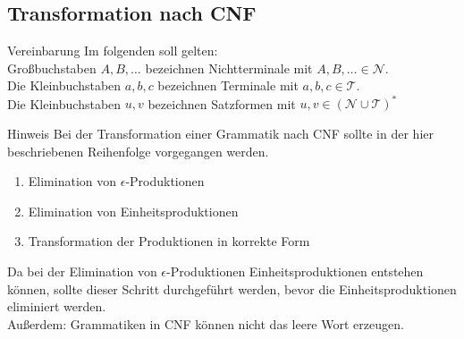 \documentclass[]{beamer}
\begin{document}
\subsection{Transformation nach CNF}
\begin{frame}[squeeze]{}
  \vspace*{-0.25em}
  \begin{alertblock}{Vereinbarung}
    Im folgenden soll gelten: \\
    \vspace*{0.5em}
    Großbuchstaben $A, B, \ldots$ bezeichnen Nichtterminale mit $A, B, \ldots \in \mathcal{N}$. \\
    \vspace*{0.5em}
    Die Kleinbuchstaben $a, b, c$ bezeichnen Terminale mit $a, b, c \in \mathcal{T}$. \\
    \vspace*{0.5em}
    Die Kleinbuchstaben $u, v$ bezeichnen Satzformen mit $u, v \in \left( \mathcal{N} \cup \mathcal{T} \right)^*$
  \end{alertblock}
  
  \pause
  \vspace*{-0.25em}
  
  \begin{exampleblock}{Hinweis}
    Bei der Transformation einer Grammatik nach CNF sollte in der hier beschriebenen Reihenfolge vorgegangen werden.
    \begin{enumerate}
      \item Elimination von $\epsilon$-Produktionen
      \item Elimination von Einheitsproduktionen
      \item Transformation der Produktionen in korrekte Form
    \end{enumerate}
    Da bei der Elimination von $\epsilon$-Produktionen Einheitsproduktionen entstehen können, sollte dieser Schritt durchgeführt werden, bevor die Einheitsproduktionen eliminiert werden. \\
    \vspace*{0.5em}
    Außerdem: Grammatiken in CNF können nicht das leere Wort erzeugen.
  \end{exampleblock}
\end{frame}
\end{document}
